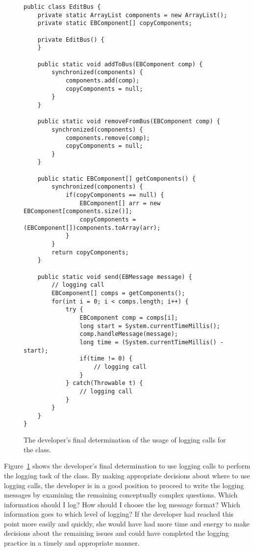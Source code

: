 \begin{figure}[p]
\def\baselinestretch{0.94}
\begin{lstlisting}
public class EditBus {
    private static ArrayList components = new ArrayList();
    private static EBComponent[] copyComponents;

    private EditBus() {
    }

    public static void addToBus(EBComponent comp) {
        synchronized(components) {
            components.add(comp);
            copyComponents = null;
        }
    }
  
    public static void removeFromBus(EBComponent comp) {
        synchronized(components) {
            components.remove(comp);
            copyComponents = null;
        }
    }

    public static EBComponent[] getComponents() {
        synchronized(components) {
            if(copyComponents == null) {
                EBComponent[] arr = new EBComponent[components.size()];
                copyComponents = (EBComponent[])components.toArray(arr);
            }
        }
        return copyComponents;
    }
  
    public static void send(EBMessage message) {
        // logging call
        EBComponent[] comps = getComponents();
        for(int i = 0; i < comps.length; i++) {
            try {
                EBComponent comp = comps[i];
                long start = System.currentTimeMillis();
                comp.handleMessage(message);
                long time = (System.currentTimeMillis() - start);
                if(time != 0) {
                    // logging call
                }
            } catch(Throwable t) {
                // logging call
            }
        }
    }
}
\end{lstlisting}
\caption{The developer's final determination of the usage of logging calls for the  class.\label{ch2-ex-logged}}
\end{figure}

Figure~\ref{ch2-ex-logged} shows the developer's final determination to use logging calls to perform the logging task of the  class. By making appropriate decisions about where to use logging calls, the developer is in a good position to proceed to write the logging messages by examining the remaining conceptually complex questions. Which information should I log? How should I choose the log message format? Which information goes to which level of logging? If the developer had reached this point more easily and quickly, she would have had more time and energy to make decisions about the remaining issues and could have completed the logging practice in a timely and appropriate manner.

